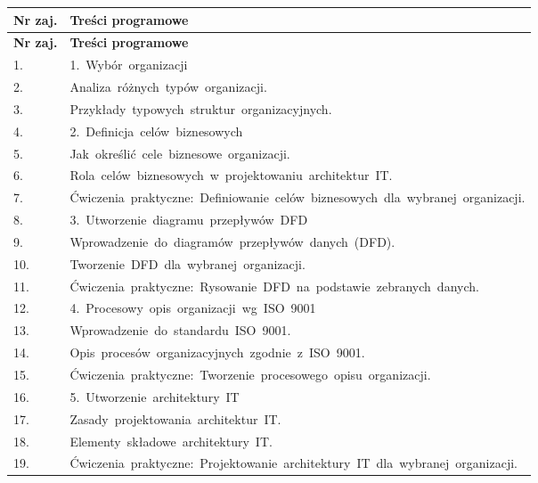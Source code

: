 \documentclass[12pt, a4paper]{article}
\newcommand{\thdrule}{\noalign{\global\setlength{\extrarowheight}{0pt}}}
\newcommand{\thdend}{\noalign{\global\setlength{\extrarowheight}{3pt}}}
\begin{document}
{\scriptsize
\begin{longtable}{m{1.5cm}m{14.5cm}}
\thdrule\toprule
\rowcolor{pjatkRed} {\color{white}\textbf{Nr zaj.}} & {\color{white}\textbf{Treści programowe}} \\
\midrule\thdend
\endfirsthead
\thdrule\toprule
\rowcolor{pjatkRed} {\color{white}\textbf{Nr zaj.}} & {\color{white}\textbf{Treści programowe}} \\
\midrule\thdend
\endhead
  \rowcolor{tableRowLight} 1. & 1. Wybór organizacji \\
  \rowcolor{tableRowAlt} 2. & Analiza różnych typów organizacji. \\
  \rowcolor{tableRowLight} 3. & Przykłady typowych struktur organizacyjnych. \\
  \rowcolor{tableRowAlt} 4. & 2. Definicja celów biznesowych \\
  \rowcolor{tableRowLight} 5. & Jak określić cele biznesowe organizacji. \\
  \rowcolor{tableRowAlt} 6. & Rola celów biznesowych w projektowaniu architektur IT. \\
  \rowcolor{tableRowLight} 7. & Ćwiczenia praktyczne: Definiowanie celów biznesowych dla wybranej organizacji. \\
  \rowcolor{tableRowAlt} 8. & 3. Utworzenie diagramu przepływów DFD \\
  \rowcolor{tableRowLight} 9. & Wprowadzenie do diagramów przepływów danych (DFD). \\
  \rowcolor{tableRowAlt} 10. & Tworzenie DFD dla wybranej organizacji. \\
  \rowcolor{tableRowLight} 11. & Ćwiczenia praktyczne: Rysowanie DFD na podstawie zebranych danych. \\
  \rowcolor{tableRowAlt} 12. & 4. Procesowy opis organizacji wg ISO 9001 \\
  \rowcolor{tableRowLight} 13. & Wprowadzenie do standardu ISO 9001. \\
  \rowcolor{tableRowAlt} 14. & Opis procesów organizacyjnych zgodnie z ISO 9001. \\
  \rowcolor{tableRowLight} 15. & Ćwiczenia praktyczne: Tworzenie procesowego opisu organizacji. \\
  \rowcolor{tableRowAlt} 16. & 5. Utworzenie architektury IT \\
  \rowcolor{tableRowLight} 17. & Zasady projektowania architektur IT. \\
  \rowcolor{tableRowAlt} 18. & Elementy składowe architektury IT. \\
  \rowcolor{tableRowLight} 19. & Ćwiczenia praktyczne: Projektowanie architektury IT dla wybranej organizacji. \\

\end{longtable}}
\end{document}
